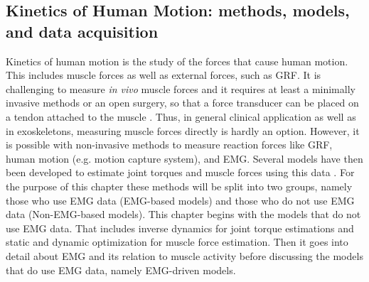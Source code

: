 
\subsection{Kinetics of Human Motion: methods, models, and data acquisition}
\label{sec:A-MSModels}
Kinetics of human motion is the study of the forces that cause human motion. 
This includes muscle forces as well as external forces, such as \ac{GRF}.
It is challenging to measure \textit{in vivo} muscle forces and it requires at least a minimally invasive methods or an open surgery, so that a force transducer can be placed on a tendon attached to the muscle \cite{Erdemir2007}. 
Thus, in general clinical application as well as in exoskeletons, measuring muscle forces directly is hardly an option.
However, it is possible with non-invasive methods to measure reaction forces like \ac{GRF}, human motion (e.g. motion capture system), and \ac{EMG}.
Several models have then been developed to estimate joint torques and muscle forces using this data \cite{Erdemir2007}.
For the purpose of this chapter these methods will be split into two groups, namely those who use \ac{EMG} data (\ac{EMG}-based models) and those who do not use \ac{EMG} data (Non-\ac{EMG}-based models).
This chapter begins with the models that do not use \ac{EMG} data.
That includes inverse dynamics for joint torque estimations and static and dynamic optimization for muscle force estimation. 
Then it goes into detail about \ac{EMG} and its relation to muscle activity before discussing the models that do use \ac{EMG} data, namely \ac{EMG}-driven models.

